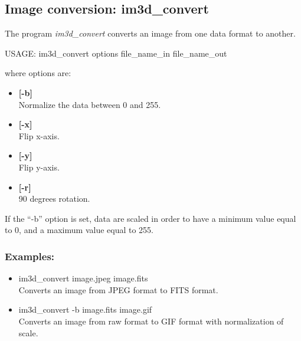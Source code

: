 \subsection{Image conversion: im3d\_convert}
The program {\em im3d\_convert} converts 
an image from one data format to another. 
{\bf
\begin{center}
     USAGE: im3d\_convert options file\_name\_in file\_name\_out
\end{center}
}
where options are:
\begin{itemize}
\baselineskip=0.4truecm
\itemsep=0.1truecm
\item {\bf[-b]} \\
Normalize the data between 0 and 255.
\item {\bf[-x]} \\
Flip x-axis.
\item {\bf[-y]} \\
Flip y-axis.
\item {\bf[-r]} \\
90 degrees rotation.
\end{itemize}
If the ``-b'' option is set, data are scaled in order to have a minimum value
equal to 0, and a maximum value equal to 255.
\subsubsection*{Examples:}
\begin{itemize}
\baselineskip=0.4truecm
\itemsep=0.1truecm
\item im3d\_convert image.jpeg image.fits \\
Converts an image from JPEG format to FITS format.
\item im3d\_convert -b image.fits image.gif \\
Converts an image from raw format to GIF format with  normalization of scale.
\end{itemize}

